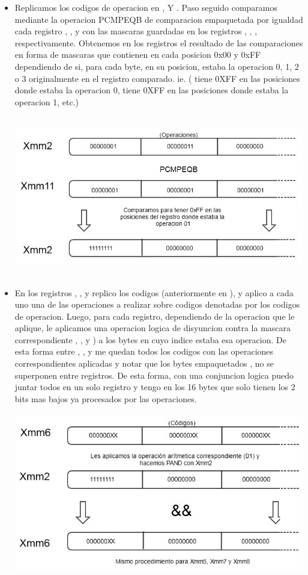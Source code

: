 \begin{itemize}
\item Replicamos los codigos de operacion en ,  Y . Paso seguido comparamos mediante la operacion PCMPEQB de comparacion empaquetada por igualdad cada registro , ,  y  con las mascaras guardadas en los registros , , ,  respectivamente. Obtenemos en los registros el resultado de las comparaciones en forma de mascaras que contienen en cada posicion 0x00 y 0xFF dependiendo de si, para cada byte, en su posicion, estaba la operacion 0, 1, 2 o 3 originalmente en el registro comparado. ie. ( tiene 0XFF en las posiciones donde estaba la operacion 0,  tiene 0XFF en las posiciones donde estaba la operacion 1, etc.)

\includegraphics[height=7cm]{comparacion.jpg} 

\item En los registros , ,  y  replico los codigos (anteriormente en ), y aplico a cada uno una de las operaciones a realizar sobre codigos denotadas por los codigos de operacion. Luego, para cada registro, dependiendo de la operacion que le aplique, le aplicamos una operacion logica de disyuncion contra la mascara correspondiente , ,  y ) a los bytes en cuyo indice estaba esa operacion. De esta forma entre , ,  y  me quedan todos los codigos con las operaciones correspondientes aplicadas y notar que los bytes empaquetados , no se superponen entre registros. De esta forma, con una conjuncion logica puedo juntar todos en un solo registro y tengo en  los 16 bytes que solo tienen los 2 bits mas bajos ya procesados por las operaciones.

\includegraphics[height=7cm]{siguienteacomparaciones.jpg} 


\end{itemize}
